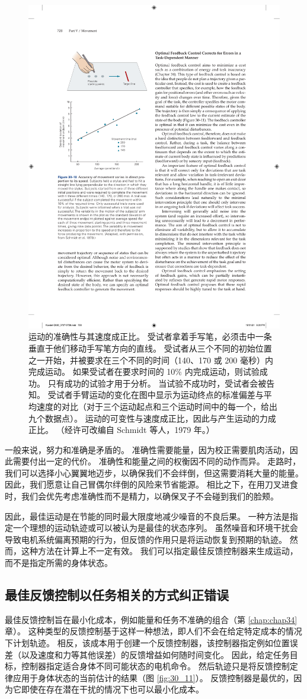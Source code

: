 \begin{figure}[htbp]
	\centering
	\includegraphics[width=0.5\linewidth]{chap30/fig_30_10}
	\caption{运动的准确性与其速度成正比。 受试者拿着手写笔，必须击中一条垂直于他们移动手写笔方向的直线。 受试者从三个不同的初始位置之一开始，并被要求在三个不同的时间（140、170 或 200 毫秒）内完成运动。 如果受试者在要求时间的 10\% 内完成运动，则试验成功。 只有成功的试验才用于分析。 当试验不成功时，受试者会被告知。 受试者手臂运动的变化在图中显示为运动终点的标准偏差与平均速度的对比（对于三个运动起点和三个运动时间中的每一个，给出九个数据点）。 运动的可变性与速度成正比，因此与产生运动的力成正比。 （经许可改编自 Schmidt 等人，1979 年。）}
	\label{fig:30_10}
\end{figure}

一般来说，努力和准确是矛盾的。 准确性需要能量，因为校正需要肌肉活动，因此需要付出一定的代价。 准确性和能量之间的权衡因不同的动作而异。 走路时，我们可以选择小心翼翼地迈步，以确保我们不会绊倒，但这需要消耗大量的能量。 因此，我们愿意让自己冒偶尔绊倒的风险来节省能源。 相比之下，在用刀叉进食时，我们会优先考虑准确性而不是精力，以确保叉子不会碰到我们的脸颊。

因此，最佳运动是在节能的同时最大限度地减少噪音的不良后果。 一种方法是指定一个理想的运动轨迹或可以被认为是最佳的状态序列。 虽然噪音和环境干扰会导致电机系统偏离预期的行为，但反馈的作用只是将运动恢复到预期的轨迹。 然而，这种方法在计算上不一定有效。 我们可以指定最佳反馈控制器来生成运动，而不是指定所需的身体状态。


\subsection{最佳反馈控制以任务相关的方式纠正错误}

最佳反馈控制旨在最小化成本，例如能量和任务不准确的组合（第 \ref{chap:chap34} 章）。 这种类型的反馈控制基于这样一种想法，即人们不会在给定特定成本的情况下计划轨迹。 相反，该成本用于创建一个反馈控制器，该控制器指定例如位置误差（以及速度和力等其他误差）的反馈增益如何随时间变化。 因此，给定任务目标，控制器指定适合身体不同可能状态的电机命令。 
然后轨迹只是将反馈控制定律应用于身体状态的当前估计的结果（图 \ref{fig:30_11}）。
反馈控制器是最优的，因为它即使在存在潜在干扰的情况下也可以最小化成本。

